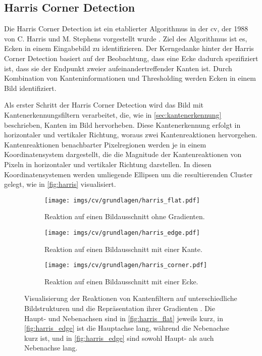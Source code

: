 
\subsection{Harris Corner Detection}
\label{sec:harris_corners}

Die Harris Corner Detection ist ein etablierter Algorithmus in der \ac{cv}, der 1988 von C. Harris und M. Stephens vorgestellt wurde \cite{harris_corners,cv_general}. Ziel des Algorithmus ist es, Ecken in einem Eingabebild zu identifizieren. Der Kerngedanke hinter der Harris Corner Detection basiert auf der Beobachtung, dass eine Ecke dadurch spezifiziert ist, dass sie der Endpunkt zweier aufeinandertreffender Kanten ist. Durch Kombination von Kanteninformationen und Thresholding werden Ecken in einem Bild identifiziert.

Als erster Schritt der Harris Corner Detection wird das Bild mit Kantenerkennungsfiltern verarbeitet, die, wie in \autoref{sec:kantenerkennung} beschrieben, Kanten im Bild hervorheben. Diese Kantenerkennung erfolgt in horizontaler und vertikaler Richtung, woraus zwei Kantenreaktionen hervorgehen. Kantenreaktionen benachbarter Pixelregionen werden je in einem Koordinatensystem dargestellt, die die Magnitude der Kantenreaktionen von Pixeln in horizontaler und vertikaler Richtung darstellen. In diesen Koordinatensystemen werden umliegende Ellipsen um die resultierenden Cluster gelegt, wie in \autoref{fig:harris} visualisiert.

\begin{figure}
    \centering
    \begin{subfigure}{0.3\textwidth}
        \centering
        \texttt{[image: imgs/cv/grundlagen/harris\_flat.pdf]}
        \caption{Reaktion auf einen Bildausschnitt ohne Gradienten.}
        \label{fig:harris_flat}
    \end{subfigure}
    \hfill
    \begin{subfigure}{0.3\textwidth}
        \centering
        \texttt{[image: imgs/cv/grundlagen/harris\_edge.pdf]}
        \caption{Reaktion auf einen Bildausschnitt mit einer Kante.}
        \label{fig:harris_edge}
    \end{subfigure}
    \hfill
    \begin{subfigure}{0.3\textwidth}
        \centering
        \texttt{[image: imgs/cv/grundlagen/harris\_corner.pdf]}
        \caption{Reaktion auf einen Bildausschnitt mit einer Ecke.}
        \label{fig:harris_corner}
    \end{subfigure}
    \caption{Visualisierung der Reaktionen von Kantenfiltern auf unterschiedliche Bildstrukturen und die Repräsentation ihrer Gradienten \cite{harris_visualization}. Die Haupt- und Nebenachsen sind in \autoref{fig:harris_flat} jeweils kurz, in \autoref{fig:harris_edge} ist die Hauptachse lang, während die Nebenachse kurz ist, und in \autoref{fig:harris_edge} sind sowohl Haupt- als auch Nebenachse lang.}
    \label{fig:harris}
\end{figure}


